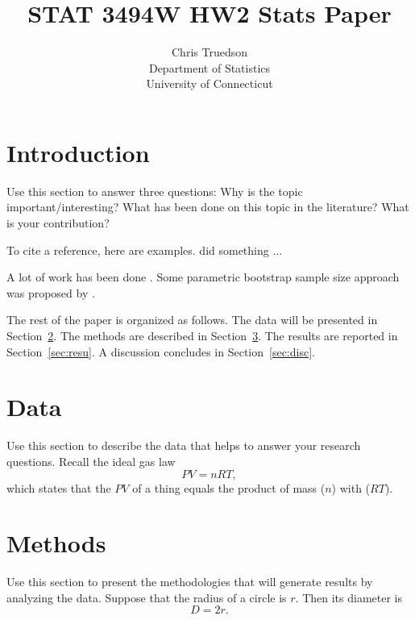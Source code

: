 \documentclass[12pt]{article}
\title{STAT 3494W HW2 Stats Paper}
\author{Chris Truedson\\
  Department of Statistics\\
  University of Connecticut
}
\begin{document}
\maketitle

\begin{abstract}
\lipsum[1]
\end{abstract}


\section{Introduction}
\label{sec:intro}

Use this section to answer three questions:
Why is the topic important/interesting?
What has been done on this topic in the literature?
What is your contribution?

\lipsum[2]

To cite a reference, here are examples.
\citet{zou2006adaptive} did something ... \lipsum[1]

A lot of work has been done \citep[e.g.,][]{zou2006sparse}.
\lipsum[2]
Some parametric bootstrap sample size approach was proposed by
\citet{zou2006adaptive}. 


The rest of the paper is organized as follows.
The data will be presented in Section~\ref{sec:data}.
The methods are described in Section~\ref{sec:meth}.
The results are reported in Section~\ref{sec:resu}.
A discussion concludes in Section~\ref{sec:disc}.


\section{Data}
\label{sec:data}

Use this section to describe the data that helps to answer your research
questions. Recall the ideal gas law
\begin{equation}
  \label{idealgas}
  PV = nRT,
\end{equation}
which states that the $PV$ of a thing equals the product
of mass ($n$) with ($RT$).

\section{Methods}
\label{sec:meth}

Use this section to present the methodologies that will generate results by
analyzing the data. Suppose that the radius of a circle is $r$. Then its diameter is
\begin{equation}
  \label{eq:area}
  D = 2r.
\end{equation}
\end{document}
